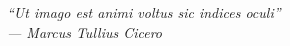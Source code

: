 \begin{epigrafe}
    \vspace*{\fill}
	\begin{flushright}
		\textit{
    	``Ut imago est animi voltus sic indices oculi''\\
    	--- Marcus Tullius Cicero}
	\end{flushright}
\end{epigrafe}
